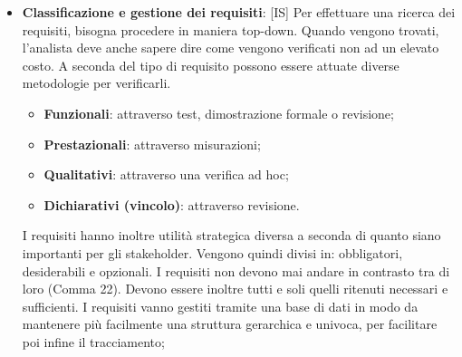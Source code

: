 \begin{itemize}
		\item \textbf{Classificazione e gestione dei requisiti}: [IS] Per effettuare una ricerca dei requisiti, bisogna procedere in maniera top-down. Quando vengono trovati, l'analista deve anche sapere dire come vengono verificati non ad un elevato costo. A seconda del tipo di requisito possono essere attuate diverse metodologie per verificarli.
			\begin{itemize}
				\item \textbf{Funzionali}: attraverso test, dimostrazione formale o revisione;
				\item \textbf{Prestazionali}: attraverso misurazioni;
				\item \textbf{Qualitativi}: attraverso una verifica ad hoc;
				\item \textbf{Dichiarativi (vincolo)}: attraverso revisione.
			\end{itemize}
			\noindent
		I requisiti hanno inoltre utilità strategica diversa a seconda di quanto siano importanti per gli stakeholder. Vengono quindi divisi in: obbligatori, desiderabili e opzionali. I requisiti non devono mai andare in contrasto tra di loro (Comma 22). Devono essere inoltre tutti e soli quelli ritenuti necessari e sufficienti. \newline
		I requisiti vanno gestiti tramite una base di dati in modo da mantenere più facilmente una struttura gerarchica e univoca, per facilitare poi infine il tracciamento;


\end{itemize}
